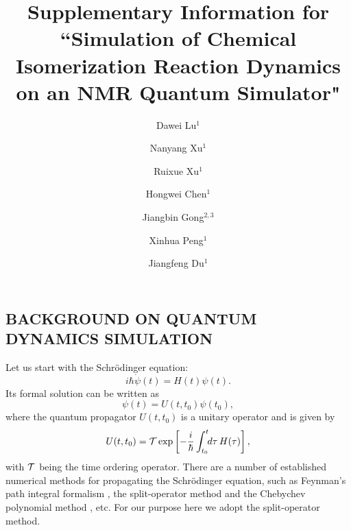 \documentclass[twocolumn,showpacs,twoside,10pt,prl]{revtex4}
\newcommand{\be}{\begin{equation}}
\newcommand{\ee}{\end{equation}}
\begin{document}
\title{Supplementary Information for ``Simulation of Chemical Isomerization Reaction Dynamics on an NMR Quantum Simulator"}
\author{Dawei Lu$^{1}$}
\author{Nanyang Xu$^{1}$}
\author{Ruixue Xu$^{1}$}
\author{Hongwei Chen$^{1}$}
\author{Jiangbin Gong$^{2,3}$}
\author{Xinhua Peng$^{1}$}
\author{Jiangfeng Du$^{1}$}




\maketitle




\subsection*{BACKGROUND ON QUANTUM DYNAMICS SIMULATION}



Let us start with the Schr\"{o}dinger equation:
\be
 i\hbar \dot\psi(t)=  H(t)\psi(t).
\ee
Its formal solution can be written as
\be
   \psi(t)=   U(t,t_0)\psi(t_0),
\ee
where the quantum propagator $U(t,t_0)$ is a unitary operator and is given by
\be
     U(t,t_0)={\cal T}\exp\left[-\frac{i}{\hbar}
  \int_{t_0}^t\!\!d\tau\,   H(\tau)\right],
\ee
with ${\cal T}$ being the time ordering operator.  There are a number of established numerical methods for propagating the Schr\"{o}dinger equation,
such as Feynman's path integral formalism \cite{Feynman2},
the split-operator method \cite{Feit2} and the Chebychev polynomial method \cite{Kosloff,Zhangbook2}, etc.  For our purpose here we adopt the split-operator method.
\end{document}
